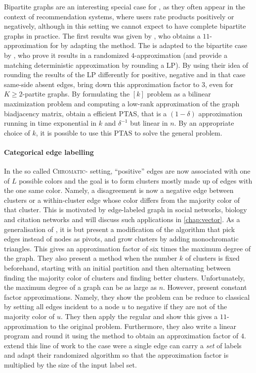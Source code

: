 Bipartite graphs are an interesting special case for \pcc{}, as they often appear in the context of
recommendation systems, where users rate products positively or negatively, although in this setting
we cannot expect to have complete bipartite graphs in practice. The first results was given by
\textcite{Amit04}, who obtains a $11$-approximation for \mind{} by adapting the \regionGrow{} method.
The \ccpivot{} is adapted to the bipartite case by
\textcite{Bipartite12}, who prove it results in a randomized $4$-approximation (and provide a matching
deterministic approximation by rounding a LP). By using their idea of rounding the results of the LP
differently for positive, negative and in that case same-side absent edges, \textcite{Chawla2014}
bring down this approximation factor to $3$, even for $K\geq 2$-partite graphs. By formulating the
\maxa{}$[k]$ problem as a bilinear maximization problem and computing a low-rank approximation of
the graph biadjacency matrix, \textcite{Asteris2016} obtain a efficient PTAS, that is a $(1-\delta)$
approximation running in time exponential in $k$ and $\delta^{-1}$ but linear in $n$. By an
appropriate choice of $k$, it is possible to use this PTAS to solve the general \maxa{} problem.

\paragraph{Categorical edge labelling}

In the so called \textsc{Chromatic}-\pcc{} setting, \enquote{positive} edges are now associated with
one of $L$ possible colors and the goal is to form clusters mostly made up of edges with the one same
color. Namely, a disagreement is now a negative edge between clusters or a within-cluster edge
whose color differs from the majority color of that cluster. This is motivated by edge-labeled graph
in social networks, biology and citation networks and will discuss such applications in
\autoref{chap:vector}. As a generalisation of \pcc{}, it is \NPc{} but \textcite{Bonchi2012a}
present a modification of the \ccpivot{} algorithm that pick edges instead of nodes as pivots, and
grow clusters by adding monochromatic triangles. This gives an approximation factor of six times the
maximum degree of the graph. They also present a method when the number $k$ of clusters is fixed
beforehand, starting with an initial partition and then alternating between finding the majority
color of clusters and finding better clusters. Unfortunately, the maximum degree of a graph can be
as large as $n$. However, \textcite{Anava2015} present constant factor approximations. Namely, they
show the problem can be reduce to classical \pcc{} by setting all edges incident to a node $u$ to
negative if they are not of the majority color of $u$. They then apply the regular \ccpivot{} and
show this gives a $11$-approximation to the original problem. Furthermore, they also write a linear
program and round it using the \regionGrow{} method to obtain an
approximation factor of $4$. \Textcite{multiChromatic15} extend this line of work to the case were a
single edge can carry a \emph{set} of labels and adapt their randomized algorithm so that the
approximation factor is multiplied by the size of the input label set.


